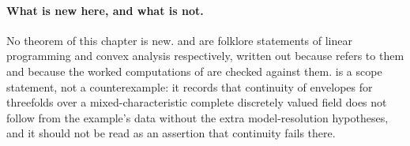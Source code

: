 \paragraph{What is new here, and what is not.}
No theorem of this chapter is new.
 and
 are folklore statements of
linear programming and convex analysis respectively, written out because
 refers to them and because the
worked computations of  are checked against them.
 is a scope statement, not a counterexample: it
records that continuity of envelopes for threefolds over a
mixed-characteristic complete discretely valued field does not follow from
the example's data without the extra model-resolution hypotheses, and it should not be read as an
assertion that continuity fails there.
